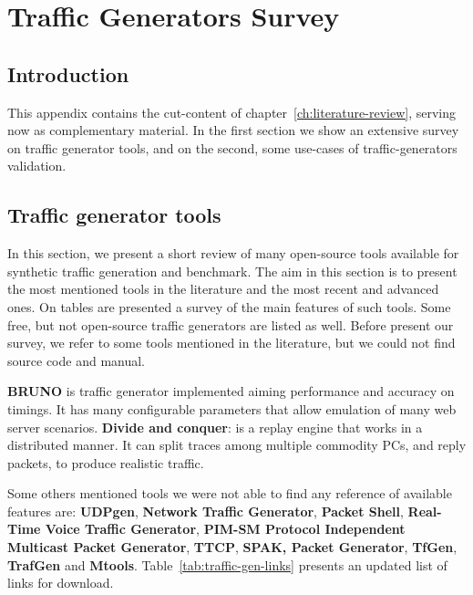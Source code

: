 \chapter{Traffic Generators Survey}\label{ap:traffic-gen-survey}

\section{Introduction}

This appendix contains the cut-content of chapter~\ref{ch:literature-review}, serving now as complementary material. In the first section we show an extensive survey on traffic generator tools, and on the second, some use-cases of traffic-generators validation.


\section{Traffic generator tools}


In this section, we present a short review of many open-source tools available for synthetic traffic generation and benchmark. The aim in this section is to present the most mentioned tools in the literature and the most recent and advanced ones. On tables are presented a survey of the main features of such tools. Some free, but not open-source traffic generators are listed as well. Before present our survey, we refer to some tools mentioned in the literature, but we could not find source code and manual. 

\textbf{BRUNO}\cite{bruno-paper} is traffic generator implemented aiming performance and accuracy on timings. It has many configurable parameters that allow emulation of many web server scenarios. \textbf{Divide and conquer}\cite{validate-trafficgen}: is a replay engine that works in a distributed manner. It can split traces among multiple commodity PCs, and reply packets, to produce realistic traffic. 

Some others mentioned tools \cite{web-ditg} we were not able to find any reference of available features are: \textbf{UDPgen}, \textbf{Network Traffic Generator}, \textbf{Packet Shell}, \textbf{Real-Time Voice Traffic Generator}, \textbf{PIM-SM Protocol Independent Multicast Packet Generator}, \textbf{TTCP}, \textbf{SPAK, Packet Generator}, \textbf{TfGen}, \textbf{TrafGen} and \textbf{Mtools}. Table~\ref{tab:traffic-gen-links} presents an updated list of links for download.


